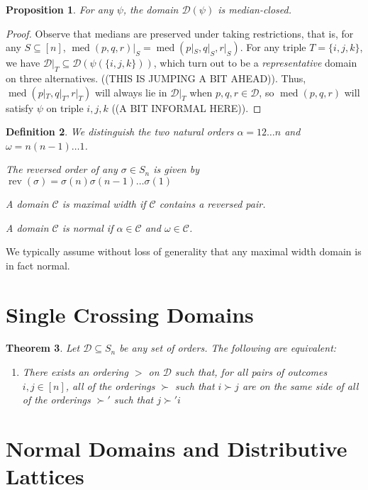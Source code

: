 \documentclass[12pt]{article}
\newtheorem{theorem}{Theorem}
\newtheorem{definition}[theorem]{Definition}
\newtheorem{proposition}[theorem]{Proposition}
\newcommand{\C}{\mathcal{C}}
\newcommand{\D}{\mathcal{D}}
\DeclareMathOperator*{\rev}{rev}
\DeclareMathOperator*{\med}{med}
\newcommand{\1}[1]{\mathds{1}[{#1}]}
\begin{document}
  \begin{proposition}
    For any $\psi$, the domain $\D(\psi)$ is median-closed.
  \end{proposition}
  \begin{proof}
    Observe that medians are preserved under taking restrictions,
    that is, for any $S\subseteq[n]$, $\med(p,q,r)|_S = 
    \med(p|_S,q|_S,r|_S)$.
    For any triple $T=\{i,j,k\}$, we have $\D|_T\subseteq\D(\psi(\{i,j,k\}))$,
    which turn out to be a \emph{representative} domain on three alternatives.
    ((THIS IS JUMPING A BIT AHEAD)).
    Thus, $\med(p|_T,q|_T,r|_T)$ will always lie in 
    $\D|_T$ when $p,q,r \in \D$, so $\med(p,q,r)$ will satisfy $\psi$ on triple
    $i,j,k$ ((A BIT INFORMAL HERE)).
  \end{proof}

  \begin{definition}
    We distinguish the two natural orders
    $\alpha = 12\ldots n$ and $\omega = n(n-1)\ldots 1$.

    The reversed order of any $\sigma\in S_n$
    is given by $\rev(\sigma) = \sigma(n)\sigma(n-1)\ldots\sigma(1)$

    A domain $\C$ is \emph{maximal width} if $\C$ contains a reversed pair.

    A domain $\C$ is \emph{normal} if $\alpha\in\C$ and $\omega\in\C$.
  \end{definition}

  We typically assume without loss of generality that any maximal width domain
  is in fact normal.

\section{Single Crossing Domains}

  \begin{theorem}
    Let $\D\subseteq S_n$ be any set of orders.
    The following are equivalent:
    \begin{enumerate}
      \item There exists an ordering $>$ on $\D$ such that,
        for all pairs of outcomes $i,j\in [n]$,
        all of the orderings $\succ$ such that $i\succ j$
        are on the same side of all of the orderings $\succ'$
        such that $j\succ' i$
    \end{enumerate}
  \end{theorem}

\section{Normal Domains and Distributive Lattices}
\end{document}
